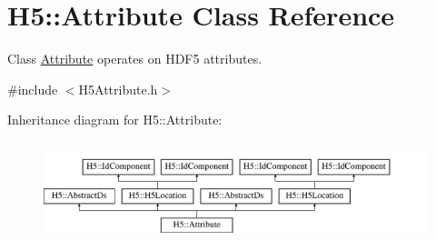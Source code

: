 \hypertarget{class_h5_1_1_attribute}{}\section{H5\+:\+:Attribute Class Reference}
\label{class_h5_1_1_attribute}


Class \hyperlink{class_h5_1_1_attribute}{Attribute} operates on H\+D\+F5 attributes.  




{\ttfamily \#include $<$H5\+Attribute.\+h$>$}

Inheritance diagram for H5\+:\+:Attribute\+:\begin{figure}[H]
\begin{center}
\leavevmode
\includegraphics[height=2.921739cm]{class_h5_1_1_attribute}
\end{center}
\end{figure}
